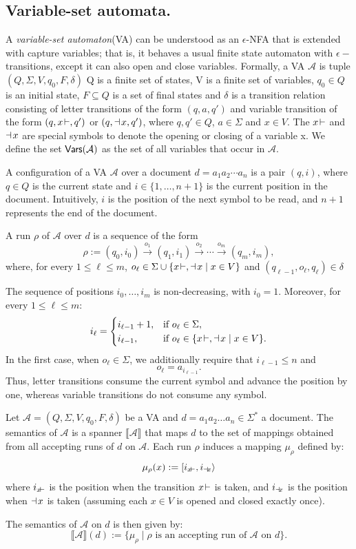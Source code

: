 \subsection{Variable-set automata.} 
A \textit{variable-set automaton}(VA) can be understood as an $\epsilon$-NFA that is extended with capture variables; that is, it behaves a usual finite state automaton with $\epsilon-$transitions, except it can also open and close variables. Formally, a VA $\mathcal{A}$ is tuple $(Q, \Sigma, V, q_0, F, \delta )$ Q is a finite set of states, V is a finite set of variables, $q_0 \in Q$ is an initial state, $F \subseteq Q$ is a set of final states and $\delta$ is a transition relation consisting of letter transitions of the form $(q, a, q')$ and variable transition of the form $(q, x\!\vdash, q')$ or $(q, \dashv\!x, q')$, where $q, q' \in Q$, $a \in \Sigma$ and $x \in V$. The $x\!\vdash$ and $\dashv\!x$ are special symbols to denote the opening or closing of a variable x. We define the set $\mathsf{Vars}(\mathcal{A})$ as the set of all variables that occur in $\mathcal{A}$.

A configuration of a VA $\mathcal{A}$ over a document 
$d = a_1 a_2 \cdots a_n$ is a pair $(q,i)$, where $q \in Q$ is the current state and 
$i \in \{1,\ldots,n+1\}$ is the current position in the document. 
Intuitively, $i$ is the position of the next symbol to be read, and $n+1$ represents the end of the document.

A run $\rho$ of $\mathcal{A}$ over $d$ is a sequence of the form
\[
\rho :=
(q_0,i_0)
\xrightarrow{o_1}
(q_1,i_1)
\xrightarrow{o_2}
\cdots
\xrightarrow{o_m}
(q_m,i_m),
\]
where, for every $1 \leq \ell \leq m$, $o_\ell \in \Sigma \cup \{x\!\vdash,\dashv\!x \mid x \in V\}$ and $(q_{\ell-1}, o_\ell, q_\ell) \in \delta$

The sequence of positions $i_0,\ldots,i_m$ is non-decreasing, with $i_0=1$. 
Moreover, for every $1 \leq \ell \leq m$:
\[
i_\ell =
\begin{cases}
	i_{\ell-1}+1, & \text{if } o_\ell \in \Sigma,\\
	i_{\ell-1}, & \text{if } o_\ell \in \{x\!\vdash,\dashv\!x \mid x \in V\}.
\end{cases}
\]
In the first case, when $o_\ell \in \Sigma$, we additionally require that $i_{\ell-1} \leq n$ and 
\[
o_\ell = a_{i_{\ell-1}}.
\]
Thus, letter transitions consume the current symbol and advance the position by one, whereas variable transitions do not consume any symbol.

Let $\mathcal{A} = (Q, \Sigma, V, q_0, F, \delta)$ be a VA and $d = a_1 a_2 \dots a_{n} \in \Sigma^*$ a document.
The semantics of $\mathcal{A}$ is a spanner 
$\llbracket \mathcal{A} \rrbracket$ 
that maps $d$ to the set of mappings obtained from all accepting runs of  $d$ on $\mathcal{A}$. Each run $\rho$ induces a mapping $\mu_\rho$ defined by:
\[
\mu_\rho(x) := [i_{x\!\vdash}, i_{\dashv\!x}\rangle\]
where $i_{x\!\vdash}$ is the position when the transition 
$x\!\vdash$ is taken, and $i_{\dashv\!x}$ is the position when 
$\dashv\!x$ is taken (assuming each $x \in V$ is opened and closed exactly once).

The semantics of $\mathcal{A}$ on $d$ is then given by:
\[
\llbracket \mathcal{A} \rrbracket(d) := 
\{ \mu_\rho \mid \rho \text{ is an accepting run of } \mathcal{A} \text{ on } d \}.
\]


